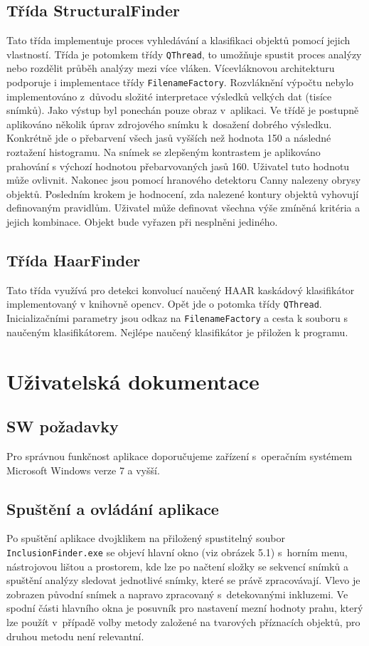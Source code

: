 \documentclass[12pt, a4paper]{report}
\begin{document}
\section{Třída StructuralFinder}	
	Tato třída implementuje proces vyhledávání a klasifikaci objektů pomocí jejich vlastností. Třída je potomkem třídy \texttt{QThread}, to umožňuje spustit proces analýzy  nebo rozdělit průběh analýzy mezi více vláken. Vícevláknovou architekturu podporuje i implementace třídy \texttt{FilenameFactory}. Rozvláknění výpočtu nebylo implementováno z~důvodu složité interpretace výsledků velkých dat (tisíce snímků). Jako výstup byl ponechán pouze obraz v~aplikaci.
	Ve třídě je postupně aplikováno několik úprav zdrojového snímku k~dosažení dobrého výsledku. Konkrétně jde o přebarvení všech jasů vyšších než hodnota 150 a následné roztažení histogramu. Na snímek se zlepšeným kontrastem je aplikováno prahování s výchozí hodnotou přebarvovaných jasů 160. Uživatel tuto hodnotu může ovlivnit. Nakonec jsou pomocí hranového detektoru Canny nalezeny obrysy objektů. Posledním krokem je hodnocení, zda nalezené kontury objektů vyhovují definovaným pravidlům.
	Uživatel může definovat všechna výše zmíněná kritéria a jejich kombinace. Objekt bude vyřazen při nesplněni jediného.  
	
\section{Třída HaarFinder}
	Tato třída využívá pro detekci konvolucí naučený HAAR kaskádový klasifikátor implementovaný v knihovně opencv. Opět jde o potomka třídy \texttt{QThread}. Inicializačními parametry jsou odkaz na \texttt{FilenameFactory} a cesta k souboru s naučeným klasifikátorem. Nejlépe naučený klasifikátor je přiložen k programu.
	
\chapter{Uživatelská dokumentace}
	\section{SW požadavky}
	Pro správnou funkčnost aplikace doporučujeme zařízení s~operačním systémem Microsoft Windows verze 7 a vyšší.
	
	\section{Spuštění a ovládání aplikace}	
Po spuštění aplikace dvojklikem na přiložený spustitelný soubor\\ \texttt{InclusionFinder.exe} se objeví hlavní okno (viz obrázek 5.1) s~horním menu, nástrojovou lištou a prostorem, kde lze po načtení složky se sekvencí snímků a spuštění analýzy sledovat jednotlivé snímky, které se právě zpracovávají. Vlevo je zobrazen původní snímek a napravo zpracovaný s~detekovanými inkluzemi. Ve spodní části hlavního okna je posuvník pro nastavení mezní hodnoty prahu, který lze použít v~případě volby metody založené na tvarových příznacích objektů, pro druhou metodu není relevantní.
\end{document}
